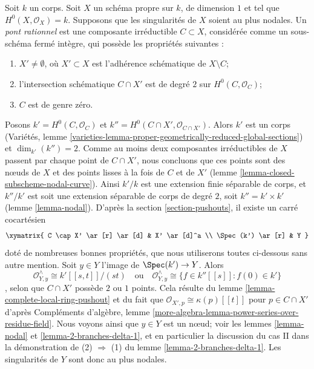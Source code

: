\begin{example} \label{example-rational-bridge} Soit $k$ un corps. Soit $X$ un schéma propre sur $k$, de dimension $1$ et tel que $H^0(X, \mathcal{O}_X) = k$. Supposons que les singularités de $X$ soient au plus nodales. Un {\it pont rationnel} est une composante irréductible $C \subset X$, considérée comme un sous-schéma fermé intègre, qui possède les propriétés suivantes : \begin{enumerate} \item $X' \not = \emptyset$, où $X' \subset X$ est l'adhérence schématique de $X \setminus C$; \item l'intersection schématique $C \cap X'$ est de degré $2$ sur $H^0(C, \mathcal{O}_C)$; \item $C$ est de genre zéro. \end{enumerate} Posons $k' = H^0(C, \mathcal{O}_C)$ et $k'' = H^0(C \cap X', \mathcal{O}_{C \cap X'})$. Alors $k'$ est un corps (Variétés, lemme \ref{varieties-lemma-proper-geometrically-reduced-global-sections}) et $\dim_{k'}(k'') = 2$. Comme au moins deux composantes irréductibles de $X$ passent par chaque point de $C \cap X'$, nous concluons que ces points sont des nœuds de $X$ et des points lisses à la fois de $C$ et de $X'$ (lemme \ref{lemma-closed-subscheme-nodal-curve}). Ainsi $k'/k$ est une extension finie séparable de corps, et $k''/k'$ est soit une extension séparable de corps de degré $2$, soit $k'' = k' \times k'$ (lemme \ref{lemma-nodal}). D'après la section \ref{section-pushouts}, il existe un carré cocartésien $$
\xymatrix{
C \cap X' \ar[r] \ar[d] &
X' \ar[d]^a \\
\Spec(k') \ar[r] &
Y
}
$$ doté de nombreuses bonnes propriétés, que nous utiliserons toutes ci-dessous sans autre mention. Soit $y \in Y$ l'image de $\Spec(k') \to Y$. Alors $$
\mathcal{O}_{Y, y}^\wedge \cong k'[[s, t]]/(st)
\quad\text{ou}\quad
\mathcal{O}_{Y, y}^\wedge \cong
\{f \in k''[[s]] : f(0) \in k'\}
$$, selon que $C \cap X'$ possède $2$ ou $1$ points. Cela résulte du lemme \ref{lemma-complete-local-ring-pushout} et du fait que $\mathcal{O}_{X', p} \cong \kappa(p)[[t]]$ pour $p \in C \cap X'$ d'après Compléments d'algèbre, lemme \ref{more-algebra-lemma-power-series-over-residue-field}. Nous voyons ainsi que $y \in Y$ est un nœud; voir les lemmes \ref{lemma-nodal} et \ref{lemma-2-branches-delta-1}, et en particulier la discussion du cas II dans la démonstration de (2) $\Rightarrow$ (1) du lemme \ref{lemma-2-branches-delta-1}. Les singularités de $Y$ sont donc au plus nodales.


\end{example}
